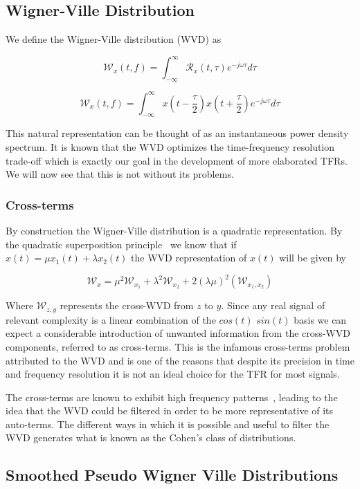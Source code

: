 \subsection{Wigner-Ville Distribution}

We define the Wigner-Ville distribution (WVD) as

$$ \mathcal{W}_{x}(t, f) =  \int_{-\infty}^{\infty} \mathcal{R}_{x}(t, \tau) e^{-j\omega \tau}d\tau$$

$$ \mathcal{W}_{x}(t, f) =  \int_{-\infty}^{\infty} x\left(t - \frac{\tau}{2}\right)x\left(t + \frac{\tau}{2}\right) e^{-j\omega \tau}d\tau$$

This natural representation can be thought of as an instantaneous power density
spectrum. It is known that the WVD optimizes the time-frequency resolution
trade-off\cite{tfr_comparison} which is exactly our goal in the development of
more elaborated TFRs. We will now see that this is not without its problems.

\subsubsection{Cross-terms}

By construction the Wigner-Ville distribution is a quadratic representation. By
the quadratic superposition principle~\cite{quadratic_freq_representation} we
know that if $x(t) = \mu x_1(t) + \lambda x_2(t)$ the WVD representation of
$x(t)$ will be given by

$$ \mathcal{W}_{x} = \mu^2\mathcal{W}_{x_1} + \lambda^2\mathcal{W}_{x_2} + 2(\lambda\mu)^2(\mathcal{W}_{x_1 , x_2})$$

Where $\mathcal{W}_{z, y}$ represents the cross-WVD from $z$ to $y$. Since any
real signal of relevant complexity is a linear combination of the $cos(t)$
$sin(t)$ basis we can expect a considerable introduction of unwanted
information from the cross-WVD components, referred to as cross-terms. This is
the infamous cross-terms problem attributed to the WVD and is one of the
reasons that despite its precision in time and frequency resolution it is not
an ideal choice for the TFR for most signals.

The cross-terms are known to exhibit high frequency patterns~\cite{martin_lol},
leading to the idea that the WVD could be filtered in order to be more
representative of its auto-terms. The different ways in which it is possible
and useful to filter the WVD generates what is known as the Cohen's class of
distributions.

\subsection{Smoothed Pseudo Wigner Ville Distributions}

